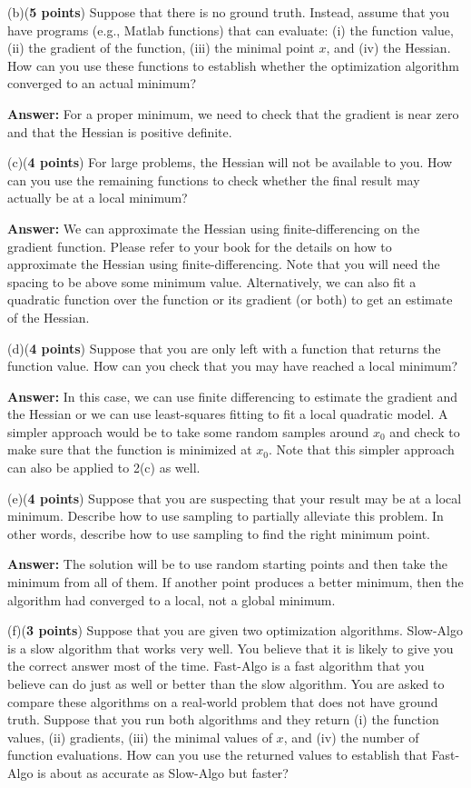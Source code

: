 \documentclass[12pt,legalpaper]{article}
\begin{document}
(b)({\bf 5 points}) Suppose that there is no ground truth. Instead, assume
   that you have programs (e.g., Matlab functions) that can evaluate: (i) the function value, (ii) the gradient of the function, 
   (iii) the minimal point $x$, and (iv) the Hessian. How can you use these functions to establish whether the optimization 
   algorithm converged to an actual minimum?
  
  {\bf Answer:} For a proper minimum, we need to check that the gradient is near zero and that the Hessian is positive definite.
   
(c)({\bf 4 points}) For large problems, the Hessian will not be available to you.
  How can you use the remaining functions to
  check whether the final result may actually be at a local minimum? 
  
  {\bf Answer:} We can approximate the Hessian using finite-differencing on the gradient function. Please refer to your book
  for the details on how to approximate the Hessian using finite-differencing. Note that you will need the spacing to be
  above some minimum value. Alternatively,
     we can also fit a quadratic function over the function or its gradient (or both) to get an estimate of the Hessian.
  
(d)({\bf 4 points}) Suppose that you are only left with a function that returns the 
  function value. How can you check that you may have reached a local minimum?
  
 {\bf Answer:} In this case, we can use finite differencing to estimate the gradient and the Hessian or we can use
 least-squares fitting to fit a local quadratic model. A simpler approach would be to take some random samples
 around $x_0$ and check to make sure that the function is minimized at $x_0$. Note that this simpler approach
 can also be applied to 2(c) as well.
  
(e)({\bf 4 points}) Suppose that you are suspecting that your result may be at a local minimum.
   Describe how to use sampling to partially alleviate this problem. In other words, describe how to use sampling 
   to find the right minimum point.
   
   {\bf Answer:} The solution will be to use random starting points and then take the minimum from all of them.
   If another point produces a better minimum, then the algorithm had converged to a local, not a global minimum.
\newpage

(f)({\bf 3 points}) Suppose that you are given two optimization algorithms.
   {\rm Slow-Algo} is a slow algorithm that works very well. You believe that it is likely to 
                            give you the correct answer most of the time.
   {\rm Fast-Algo} is a fast algorithm that you believe can do just as well or better than
                            the slow algorithm.
  You are asked to compare these algorithms on a real-world problem that does not
  have ground truth. Suppose that you run both algorithms and they return (i) the function values,
  (ii) gradients, (iii) the minimal values of $x$, and (iv) the number of function evaluations.
  How can you use the returned values to establish that {\rm Fast-Algo} is about as accurate
  as {\rm Slow-Algo} but faster?
\end{document}
